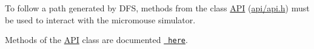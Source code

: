 To follow a path generated by D\+FS, methods from the class \mbox{\hyperlink{class_a_p_i}{A\+PI}} (\mbox{\hyperlink{api_8h}{api/api.\+h}}) must be used to interact with the micromouse simulator.
\begin{DoxyItemize}
\item Methods of the \mbox{\hyperlink{class_a_p_i}{A\+PI}} class are documented \href{https://github.com/mackorone/mms\#summary}{\texttt{ here}}. 
\end{DoxyItemize}